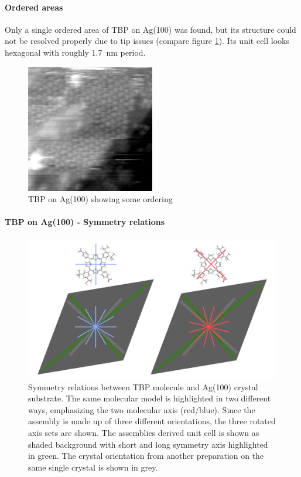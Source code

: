\paragraph{Ordered areas}
Only a single ordered area of TBP on Ag(100) was found, but its structure could not be resolved properly due to tip issues (compare figure \ref{fig:hex-TBP-Ag100}). Its unit cell looks hexagonal with roughly \SI{1.7} {\nano \meter} period. 

\begin{figure}[h]
	\centering
	\includegraphics[width=0.5\textwidth]{./images/F151007-112800}
	\caption{TBP on Ag(100) showing some ordering}
	\label{fig:hex-TBP-Ag100}
\end{figure}
\paragraph{TBP on Ag(100) - Symmetry relations}
	\begin{figure}[]
		\centering
		\includegraphics[width=\textwidth]{./images/F160429-185245-R-model-2-crystal-orientation.png}
		\caption{Symmetry relations between TBP molecule and Ag(100) crystal substrate. The same molecular model is highlighted in two different ways, emphasizing the two molecular axis (red/blue). Since the assembly is made up of three different orientations, the three rotated axis sets are shown. The assemblies derived unit cell is shown as shaded background with short and long symmetry axis highlighted in green. The crystal orientation from another preparation on the same single crystal is shown in grey.}
		\label{F160429-185245-R-model-2-crystal-orientation.png}			
	\end{figure}
	\vfill
\restoregeometry